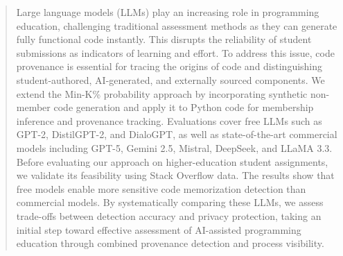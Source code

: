 \documentclass[runningheads]{llncs}
\begin{document}
\begin{abstract}

Large language models (LLMs) play an increasing role in programming education, challenging traditional assessment methods as they can generate fully functional code instantly. This disrupts the reliability of student submissions as indicators of learning and effort. To address this issue, code provenance is essential for tracing the origins of code and distinguishing student-authored, AI-generated, and externally sourced components. We extend the Min-K\% probability approach by incorporating synthetic non-member code generation and apply it to Python code for membership inference and provenance tracking. Evaluations cover free LLMs such as GPT-2, DistilGPT-2, and DialoGPT, as well as state-of-the-art commercial models including GPT-5, Gemini 2.5, Mistral, DeepSeek, and LLaMA 3.3. Before evaluating our approach on higher-education student assignments, we validate its feasibility using Stack Overflow data. The results show that free models enable more sensitive code memorization detection than commercial models. By systematically comparing these LLMs, we assess trade-offs between detection accuracy and privacy protection, taking an initial step toward effective assessment of AI-assisted programming education through combined provenance detection and process visibility.




\end{abstract}
%
%
%
\end{document}
